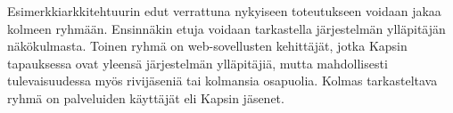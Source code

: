 Esimerkkiarkkitehtuurin edut verrattuna nykyiseen toteutukseen voidaan jakaa kolmeen ryhmään. Ensinnäkin etuja voidaan tarkastella järjestelmän ylläpitäjän näkökulmasta. Toinen ryhmä on web-sovellusten kehittäjät, jotka Kapsin tapauksessa ovat yleensä järjestelmän ylläpitäjiä, mutta mahdollisesti tulevaisuudessa myös rivijäseniä tai kolmansia osapuolia. Kolmas tarkasteltava ryhmä on palveluiden käyttäjät eli Kapsin jäsenet.